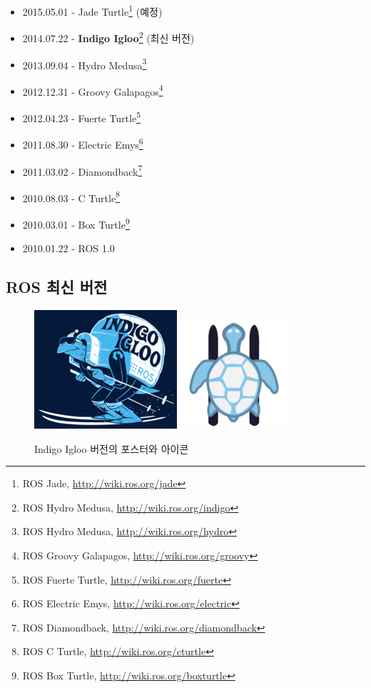 \begin{itemize}
\item 2015.05.01 - Jade Turtle\footnote{ROS Jade, \url{http://wiki.ros.org/jade}} (예정)
\item 2014.07.22 - \textbf{Indigo Igloo}\footnote{ROS Hydro Medusa, \url{http://wiki.ros.org/indigo}} (최신 버전)
\item 2013.09.04 - Hydro Medusa\footnote{ROS Hydro Medusa, \url{http://wiki.ros.org/hydro}}
\item 2012.12.31 - Groovy Galapagos\footnote{ROS Groovy Galapagos, \url{http://wiki.ros.org/groovy}}
\item 2012.04.23 - Fuerte Turtle\footnote{ROS Fuerte Turtle, \url{http://wiki.ros.org/fuerte}}
\item 2011.08.30 - Electric Emys\footnote{ROS Electric Emys, \url{http://wiki.ros.org/electric}}
\item 2011.03.02 - Diamondback\footnote{ROS Diamondback, \url{http://wiki.ros.org/diamondback}}
\item 2010.08.03 - C Turtle\footnote{ROS C Turtle, \url{http://wiki.ros.org/cturtle}}
\item 2010.03.01 - Box Turtle\footnote{ROS Box Turtle, \url{http://wiki.ros.org/boxturtle}}
\item 2010.01.22 - ROS 1.0
\end{itemize}

\subsection{ROS 최신 버전}

\begin{figure}[h]
\centering
\includegraphics[width=0.4\columnwidth]{pictures/chapter1/indigo_igloo.png}
\includegraphics[width=0.3\columnwidth]{pictures/chapter1/indigo_igloo_icon.png}
\caption{Indigo Igloo 버전의 포스터와 아이콘}
\end{figure}

